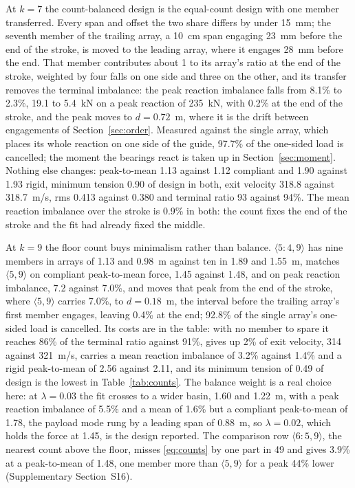 \documentclass[preprint,12pt,number]{elsarticle}
\newcommand{\cfg}[2]{\langle #1,#2\rangle}
\newcommand{\ptm}{peak-to-mean}
\begin{document}
At $k=7$ the count-balanced design is the equal-count design with one member transferred. Every span and offset the two share differs by under 15~mm; the seventh member of the trailing array, a 10~cm span engaging 23~mm before the end of the stroke, is moved to the leading array, where it engages 28~mm before the end. That member contributes about 1 to its array's ratio at the end of the stroke, weighted by four falls on one side and three on the other, and its transfer removes the terminal imbalance: the peak reaction imbalance falls from 8.1\% to 2.3\%, 19.1 to 5.4~kN on a peak reaction of 235~kN, with 0.2\% at the end of the stroke, and the peak moves to $d = 0.72$~m, where it is the drift between engagements of Section~\ref{sec:order}. Measured against the single array, which places its whole reaction on one side of the guide, 97.7\% of the one-sided load is cancelled; the moment the bearings react is taken up in Section~\ref{sec:moment}. Nothing else changes: \ptm{} 1.13 against 1.12 compliant and 1.90 against 1.93 rigid, minimum tension 0.90 of design in both, exit velocity 318.8 against 318.7~m/s, rms 0.413 against 0.380 and terminal ratio 93 against 94\%. The mean reaction imbalance over the stroke is 0.9\% in both: the count fixes the end of the stroke and the fit had already fixed the middle.

At $k=9$ the floor count buys minimalism rather than balance. $\cfg{5{:}4}{9}$ has nine members in arrays of 1.13 and 0.98~m against ten in 1.89 and 1.55~m, matches $\cfg{5}{9}$ on compliant \ptm{} force, 1.45 against 1.48, and on peak reaction imbalance, 7.2 against 7.0\%, and moves that peak from the end of the stroke, where $\cfg{5}{9}$ carries 7.0\%, to $d = 0.18$~m, the interval before the trailing array's first member engages, leaving 0.4\% at the end; 92.8\% of the single array's one-sided load is cancelled. Its costs are in the table: with no member to spare it reaches 86\% of the terminal ratio against 91\%, gives up 2\% of exit velocity, 314 against 321~m/s, carries a mean reaction imbalance of 3.2\% against 1.4\% and a rigid \ptm{} of 2.56 against 2.11, and its minimum tension of 0.49 of design is the lowest in Table~\ref{tab:counts}. The balance weight is a real choice here: at $\lambda = 0.03$ the fit crosses to a wider basin, 1.60 and 1.22~m, with a peak reaction imbalance of 5.5\% and a mean of 1.6\% but a compliant \ptm{} of 1.78, the payload mode rung by a leading span of 0.88~m, so $\lambda = 0.02$, which holds the force at 1.45, is the design reported. The comparison row $\cfg{6{:}5}{9}$, the nearest count above the floor, misses \eqref{eq:counts} by one part in 49 and gives 3.9\% at a \ptm{} of 1.48, one member more than $\cfg{5}{9}$ for a peak 44\% lower (Supplementary Section~S16).
\end{document}
